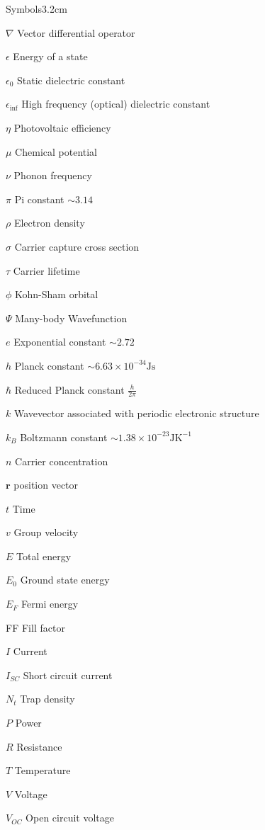\begin{mclistof}{Symbols}{3.2cm}

\item[$\nabla$] Vector differential operator
\item[$\epsilon$] Energy of a state
\item[$\epsilon_0$] Static dielectric constant
\item[$\epsilon_{\inf}$] High frequency (optical) dielectric constant 
\item[$\eta$] Photovoltaic efficiency
\item[$\mu$] Chemical potential
\item[$\nu$] Phonon frequency
\item[$\pi$] Pi constant $\sim 3.14$
\item[$\rho$] Electron density
\item[$\sigma$] Carrier capture cross section
\item[$\tau$] Carrier lifetime
\item[$\phi$] Kohn-Sham orbital

\item[$\Psi$] Many-body Wavefunction

\vspace{\frontmatterbaselineskip}

\item[$e$] Exponential constant $\sim 2.72$
\item[$h$] Planck constant $\sim 6.63\times10^{-34}\textrm{Js}$
\item[$\hbar$] Reduced Planck constant $\frac{h}{2\pi}$ 
\item[$k$] Wavevector associated with periodic electronic structure
\item[$k_B$] Boltzmann constant $\sim 1.38\times10^{-23}\textrm{JK}^{-1}$
\item[$n$] Carrier concentration
\item[$\textbf{r}$] position vector
\item[$t$] Time
\item[$v$] Group velocity

\vspace{\frontmatterbaselineskip}

\item[$E$] Total energy
\item[$E_0$] Ground state energy
\item[$E_F$] Fermi energy
\item[FF] Fill factor
\item[$I$] Current
\item[$I_{SC}$] Short circuit current
\item[$N_t$] Trap density
\item[$P$] Power
\item[$R$] Resistance
\item[$T$] Temperature
\item[$V$] Voltage
\item[$V_{OC}$] Open circuit voltage


\end{mclistof} 